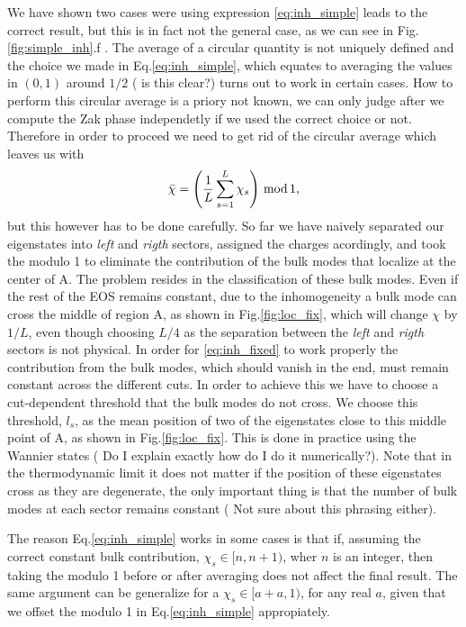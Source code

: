 \documentclass[twocolumn,amsmath,longbibliography,amssymb,superscriptaddress]{revtex4-1}
\newcommand{\carlos}[1]{{\color{red} #1}}
\begin{document}
We have shown two cases were using expression \ref{eq:inh_simple} leads to the correct result, but this is in fact not the general case, as we can see in Fig.\ref{fig:simple_inh}.f . The average of a circular quantity is not uniquely defined and the choice we made in Eq.\ref{eq:inh_simple}, which equates to averaging the values in $(0,1)$ around $1/2$ (\carlos{is this clear?}) turns out to work in certain cases. How to perform this circular average is a priory not known, we can only judge after we compute the Zak phase independetly if we used the correct choice or not. Therefore in order to proceed we need to get rid of the circular average which leaves us with
\begin{align}
\bar{\chi} =\left(\frac{1}{L}\sum_{s=1}^L \chi_s \right)\, \rm{mod} \, 1,
\label{eq:inh_fixed}
\end{align}
but this however has to be done carefully. So far we have naively separated our eigenstates into \emph{left} and \emph{rigth} sectors, assigned the charges acordingly, and took the modulo 1 to eliminate the contribution of the bulk modes that localize at the center of A. The problem resides in the classification of these bulk modes. Even if the rest of the EOS remains constant, due to the inhomogeneity a bulk mode can cross the middle of region A, as shown in Fig.\ref{fig:loc_fix}, which will change $\chi$ by $1/L$, even though choosing $L/4$ as the separation between the \emph{left} and \emph{rigth} sectors is not physical. In order for \ref{eq:inh_fixed} to work properly the contribution from the bulk modes, which should vanish in the end, must remain constant across the different cuts. In order to achieve this we have to choose a cut-dependent threshold that the bulk modes do not cross. We choose this threshold, $l_s$, as the mean position of two of the eigenstates close to this middle point of A, as shown in Fig.\ref{fig:loc_fix}. This is done in practice using the Wannier states (\carlos{Do I explain exactly how do I do it numerically?}).
Note that in the thermodynamic limit it does not matter if the position of these eigenstates cross as they are degenerate, the only important thing is that the number of bulk modes at each sector remains constant (\carlos{Not sure about this phrasing either}). 

The reason Eq.\ref{eq:inh_simple} works in some cases is that if, assuming the correct constant bulk contribution, $\chi_s \in [n,n+1)$, wher $n$ is an integer, then taking the modulo 1 before or after averaging does not affect the final result. The same argument can be generalize for a $\chi_s \in [a+a,1)$, for any real $a$, given that we offset the modulo 1 in Eq.\ref{eq:inh_simple} appropiately.
\end{document}
